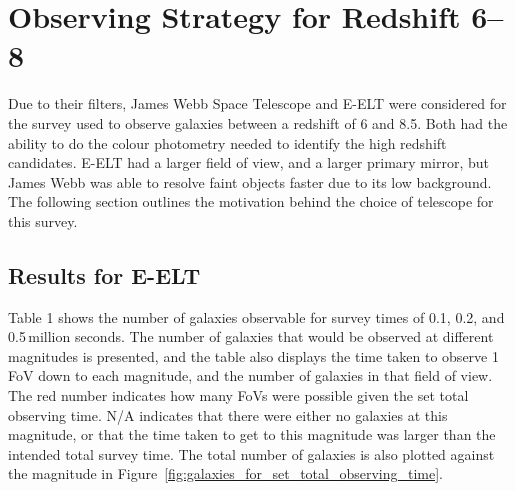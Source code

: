 
\section{Observing Strategy for Redshift 6--8} %
\label{sec:observing_strategy_for_redshift_6_8}
	Due to their filters, James Webb Space Telescope and E-ELT were considered for the survey used to observe galaxies between a redshift of 6 and 8.5. Both had the ability to do the colour photometry needed to identify the high redshift candidates. E-ELT had a larger field of view, and a larger primary mirror, but James Webb was able to resolve faint objects faster due to its low background. The following section outlines the motivation behind the choice of telescope for this survey.

	\subsection{Results for E-ELT} %
	\label{sub:results_for_e_elt}
		Table 1 shows the number of galaxies observable for survey times of 0.1, 0.2, and 0.5\,million seconds. The number of galaxies that would be observed at different magnitudes is presented, and the table also displays the time taken to observe 1\,FoV down to each magnitude, and the number of galaxies in that field of view. The red number indicates how many FoVs were possible given the set total observing time. N/A indicates that there were either no galaxies at this magnitude, or that the time taken to get to this magnitude was larger than the intended total survey time. The total number of galaxies is also plotted against the magnitude in Figure~\ref{fig:galaxies_for_set_total_observing_time}.
